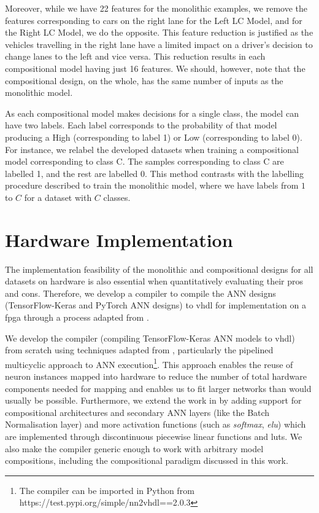 Moreover, while we have 22 features for the monolithic examples, we remove the features corresponding to cars on the right lane for the Left LC Model, and for the Right LC Model, we do the opposite. This feature reduction is justified as the vehicles travelling in the right lane have a limited impact on a driver's decision to change lanes to the left and vice versa. This reduction results in each compositional model having just 16 features. We should, however, note that the compositional design, on the whole, has the same number of inputs as the monolithic model. 

As each compositional model makes decisions for a single class, the model can have two labels. Each label corresponds to the probability of that model producing a High (corresponding to label 1) or Low (corresponding to label 0). For instance, we relabel the developed datasets when training a compositional model corresponding to class $\text{C}$. The samples corresponding to class $\text{C}$ are labelled 1, and the rest are labelled 0. This method contrasts with the labelling procedure described to train the monolithic model, where we have labels from $1$ to $C$ for a dataset with $C$ classes.





\section{Hardware Implementation}
\label{sec:hardware}


The implementation feasibility of the monolithic and compositional designs for all datasets on hardware is also essential when quantitatively evaluating their pros and cons. Therefore, we develop a compiler to compile the ANN designs (TensorFlow-Keras \cite{martin_abadi_tensorflow_2015} and PyTorch \cite{paszke_pytorch_2019-1} ANN designs) to \gls{vhdl} for implementation on a \gls{fpga} through a process adapted from \cite{allen_compositional_2019-1}. 

We develop the compiler (compiling TensorFlow-Keras ANN models to \gls{vhdl}) from scratch using techniques adapted from \cite{allen_compositional_2019-1}, particularly the pipelined multicyclic approach to ANN execution\footnote{The compiler can be imported in Python from https://test.pypi.org/simple/nn2vhdl==2.0.3}. This approach enables the reuse of neuron instances mapped into hardware to reduce the number of total hardware components needed for mapping and enables us to fit larger networks than would usually be possible. Furthermore, we extend the work in \cite{allen_compositional_2019-1} by adding support for compositional architectures and secondary ANN layers (like the Batch Normalisation layer) and more activation functions (such as \textit{softmax}, \textit{\gls{elu}}) which are implemented through discontinuous piecewise linear functions and \glspl{lut}. We also make the compiler generic enough to work with arbitrary model compositions, including the compositional paradigm discussed in this work. 

